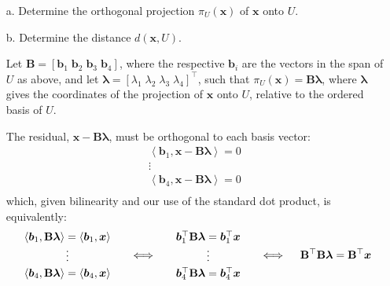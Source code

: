 \documentclass[11pt]{article}
\newcommand{\mat}[1]{\mathbf{#1}}   %
\newcommand{\vect}[1]{\bm{#1}}      %
\newcommand{\x}{\vect{x}}           %
\newcommand{\inner}[2]{\left\langle#1, #2\right\rangle}  %
\theoremstyle{definition}
\theoremstyle{plain}
\theoremstyle{remark}
\begin{document}
\begin{enumerate}
          \begin{enumerate}
              \item[a.] Determine the orthogonal projection $\pi_U(\x)$ of $\x$ onto $U$.
              \item[b.] Determine the distance $d(\x, U)$.

                    \vspace{1em}

                    Let $\mat{B} = [ \vect{b}_1 \; \vect{b}_2 \; \vect{b}_3 \; \vect{b}_4  ]$, where the respective
                    $\vect{b}_i$ are the vectors in the span of $U$ as above, and let $\bm{\lambda} = [ \lambda_1 \;
                        \lambda_2 \; \lambda_3 \; \lambda_4 ]^\top$, such that $\pi_U(\x) = \mat{B}\bm{\lambda}$, where
                    $\bm{\lambda}$ gives the coordinates of the projection of $\x$ onto $U$, relative to the ordered
                    basis of $U$.

                    The residual, $\x - \mat{B} \bm{\lambda}$, must be orthogonal to each basis vector:
                    \[
                        \begin{array}{c}
                            \inner{\vect{b}_1}{\x - \mat{B}\bm{\lambda}} = 0 \\ \vdots \\ [2pt]
                            \inner{\vect{b}_4}{\x - \mat{B}\bm{\lambda}} = 0 \\
                        \end{array}
                    \]
                    which, given bilinearity and our use of the standard dot product, is equivalently:
                    \[
                        \begin{array}{c}
                            \inner{\vect{b}_1}{\mat{B}\bm{\lambda}} = \inner{\vect{b}_1}{\x} \\ \vdots \\ [2pt]
                            \inner{\vect{b}_4}{\mat{B}\bm{\lambda}} = \inner{\vect{b}_4}{\x} \\
                        \end{array}
                        \quad
                        \iff
                        \quad
                        \begin{array}{c}
                            \vect{b}_1^\top \mat{B}\bm{\lambda}= \vect{b}_1^\top \x \\ \vdots \\ [2pt]
                            \vect{b}_4^\top \mat{B}\bm{\lambda}= \vect{b}_4^\top \x \\
                        \end{array}
                        \quad
                        \iff
                        \quad
                        \mat{B}^\top \mat{B} \bm{\lambda} = \mat{B}^\top \x \\ [2pt]
                    \]


\end{enumerate}
\end{enumerate}
\end{document}
